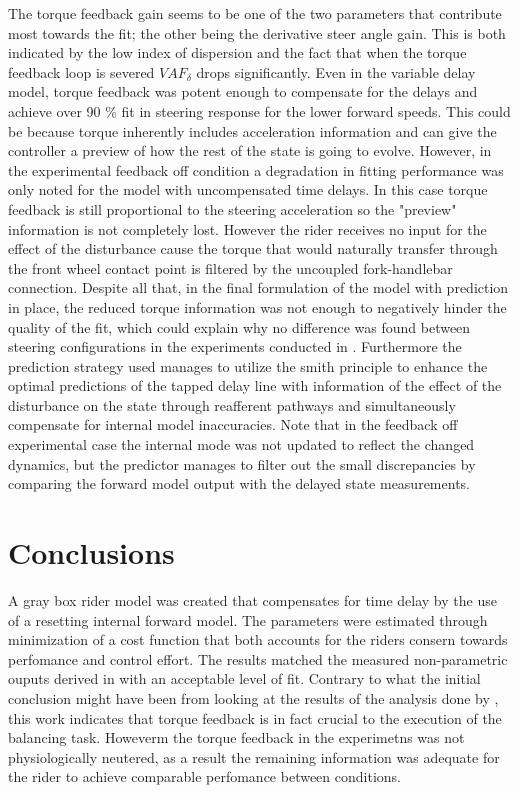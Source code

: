 The torque feedback gain seems to be  one of the two  parameters that contribute most towards the fit; the other being the derivative steer angle gain. This is both indicated by the low index of dispersion and the fact that when the torque feedback loop is severed \ensuremath{\mathit{VAF}_\delta} drops significantly. Even in the variable delay model, torque feedback was potent enough to compensate for the delays and achieve over 90 \% fit in steering response for the lower forward speeds. This could be because torque inherently includes acceleration information and can give  the controller a preview of how the rest of the state is going to evolve. However, in the experimental feedback off condition a degradation in fitting performance was only noted for the model with uncompensated time delays. In this case torque feedback is still proportional to the steering acceleration so the "preview" information is not completely lost. However the rider receives no input for the effect of the disturbance cause the torque that would naturally transfer through the front wheel contact point is filtered by the uncoupled fork-handlebar connection.  Despite all that, in the final formulation of the model with prediction in place, the reduced torque information was not enough to negatively hinder the quality of the fit, which could explain why no difference was found between steering configurations in the experiments conducted in \cite{dialynaseffect}. Furthermore  the  prediction strategy used  manages to utilize the smith  principle to enhance the optimal  predictions of the tapped delay line with  information of the effect of the disturbance on the state through reafferent pathways and simultaneously compensate for internal model inaccuracies. Note that in the feedback off experimental case the internal mode was not updated to reflect the changed dynamics, but the predictor manages to filter out the small discrepancies by comparing the forward model output with the delayed state measurements.


\section{Conclusions}
A gray box rider model was created that compensates for time delay by the use of a resetting  internal forward model. The parameters were estimated through minimization of a cost function that both accounts for the riders consern towards perfomance and control effort. The results matched the measured non-parametric ouputs derived in \cite{dialynaseffect} with an acceptable level of fit. Contrary to what the initial conclusion might have been from looking at the results of the analysis done by \citet{dialynaseffect}, this work indicates that torque feedback is in fact crucial to the execution of the balancing task. Howeverm the torque feedback in the experimetns was not physiologically neutered, as a result  the remaining information was adequate for the rider to achieve comparable perfomance between conditions.


